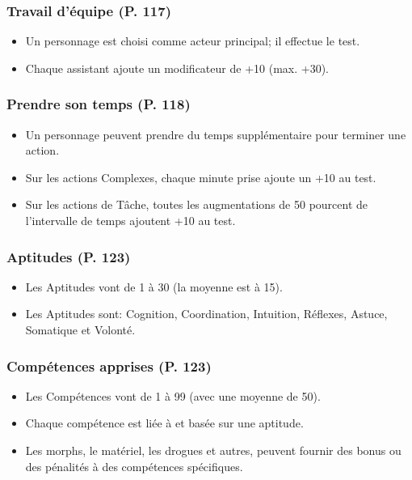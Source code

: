 \subsubsection{Travail d'équipe (P. 117)} 

\begin{itemize} \item Un personnage est choisi comme acteur principal; il effectue le test. \item Chaque assistant ajoute un modificateur de +10 (max. +30). \end{itemize} 

\subsubsection{Prendre son temps (P. 118)} 

\begin{itemize} \item Un personnage peuvent prendre du temps supplémentaire pour terminer une action. \item Sur les actions Complexes, chaque minute prise ajoute un +10 au test. \item Sur les actions de Tâche, toutes les augmentations de 50 pourcent de l'intervalle de temps ajoutent +10 au test. \end{itemize} 

\subsubsection{Aptitudes (P. 123)} 

\begin{itemize} \item Les Aptitudes vont de 1 à 30 (la moyenne est à 15). \item Les Aptitudes sont: Cognition, Coordination, Intuition, Réflexes, Astuce, Somatique et Volonté. \end{itemize} 

\subsubsection{Compétences apprises (P. 123)} 

\begin{itemize} \item Les Compétences vont de 1 à 99 (avec une moyenne de 50). \item Chaque compétence est liée à et basée sur une aptitude. \item Les morphs, le matériel, les drogues et autres, peuvent fournir des bonus ou des pénalités à des compétences spécifiques. \end{itemize} 

